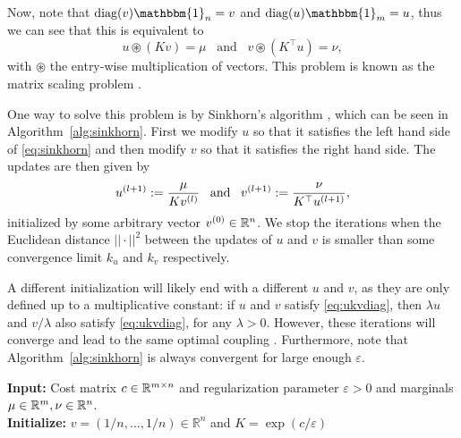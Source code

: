Now, note that $\text{diag}(v) \mathbbm{1}_n = v$ and $\text{diag}(u) \mathbbm{1}_m = u$, thus we can see that this is equivalent to 
\begin{equation}
	u \circledast (Kv) = \mu \;\;\;\text{and}\;\;\; v \circledast (K^\top u) = \nu,
	\label{eq:sinkhorn}
\end{equation}
with $\circledast$ the entry-wise multiplication of vectors. This problem is known as the matrix scaling problem \citep{nemirovski1999}. \par 
One way to solve this problem is by Sinkhorn's algorithm \citep{sinkhorn1964}, which can be seen in Algorithm~\ref{alg:sinkhorn}. First we modify $u$ so that it satisfies the left hand side of \eqref{eq:sinkhorn} and then modify $v$ so that it satisfies the right hand side. The updates are then given by 
\begin{equation}
	u^{(l + 1)} := \frac{\mu}{Kv^{(l)}} \;\;\; \text{and} \;\;\; v^{(l+1)} := \frac{\nu}{K^\top u^{(l+1)}},
\end{equation}
initialized by some arbitrary vector $v^{(0)} \in \mathbb{R}^n$. We stop the iterations when the Euclidean distance $||\cdot||^2$ between the updates of $u$ and $v$ is smaller than some convergence limit $k_u$ and $k_v$ respectively. 
\vspace{0.3cm}
\begin{remark}
	A different initialization will likely end with a different $u$ and $v$, as they are only defined up to a multiplicative constant: if $u$ and $v$ satisfy \eqref{eq:ukvdiag}, then $\lambda u$ and $v/\lambda$ also satisfy \eqref{eq:ukvdiag}, for any $\lambda > 0$. However, these iterations will converge and lead to the same optimal coupling \citep{peyre2020}. Furthermore, note that Algorithm~\ref{alg:sinkhorn} is always convergent for large enough $\varepsilon$. 
\end{remark}
\begin{algorithm}[b]
	\caption{Sinkhorn's Algorithm for OT}
	\textbf{Input: } Cost matrix $c \in \mathbb{R}^{m \times n}$ and regularization parameter $\varepsilon > 0$ and marginals $\mu \in \mathbb{R}^m, \nu \in \mathbb{R}^n$. \\
	\textbf{Initialize:} $v = (1/n, \dots, 1/n) \in \mathbb{R}^{n}$ and $K = \exp(c/\varepsilon)$ \\
	\label{alg:sinkhorn}
\end{algorithm}

